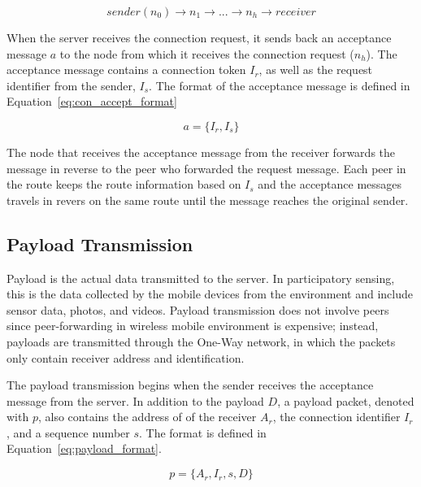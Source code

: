 \begin{equation}
sender(n_0) \rightarrow n_1 \rightarrow ... \rightarrow n_h \rightarrow receiver
\end{equation}

When the server receives the connection request, it sends back an acceptance
message $a$ to the node from which it receives the connection request ($n_h$).
The acceptance message contains a connection token $I_r$, as well as the
request identifier from the sender, $I_s$. The format of the acceptance
message is defined in Equation~\ref{eq:con_accept_format}

\begin{equation}\label{eq:con_accept_format}
a = \{I_r, I_s\}
\end{equation}

The node that receives the acceptance message from the receiver forwards
the message in reverse to the peer who forwarded the request message.
Each peer in the route keeps the route information based on $I_s$ and
the acceptance messages travels in revers on the same route until the
message reaches the original sender.


\subsection{Payload Transmission}

Payload is the actual data transmitted to the server. In participatory
sensing, this is the data collected by the mobile devices from the
environment and include sensor data, photos, and videos. Payload
transmission does not involve peers since peer-forwarding in wireless
mobile environment is expensive; instead, payloads are transmitted
through the One-Way network, in which the packets only contain receiver
address and identification.

The payload transmission begins when the sender receives the acceptance
message from the server. In addition to the payload $D$, a payload
packet, denoted with $p$, also contains the address of of the receiver
$A_r$, the connection identifier $I_r$, and a sequence number $s$. The
format is defined in Equation~\ref{eq:payload_format}.

\begin{equation}\label{eq:payload_format}
p = \{A_r, I_r, s, D\}
\end{equation}

